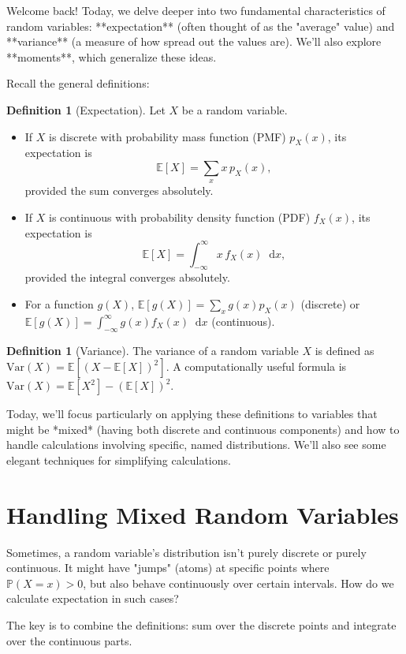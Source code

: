 \documentclass[11pt, letterpaper]{article}
\theoremstyle{plain} %
\theoremstyle{definition} %
\newtheorem{definition}[theorem]{Definition}
\theoremstyle{remark} %
\newcommand{\E}{\mathbb{E}}
\newcommand{\Var}{\mathrm{Var}}
\newcommand{\Prob}{\mathbb{P}}
\newcommand{\dee}{\mathop{}\!\mathrm{d}} %
\begin{document}
Welcome back! Today, we delve deeper into two fundamental characteristics of random variables: **expectation** (often thought of as the "average" value) and **variance** (a measure of how spread out the values are). We'll also explore **moments**, which generalize these ideas.

Recall the general definitions:

\begin{definition}[Expectation]
Let $X$ be a random variable.
\begin{itemize}
    \item If $X$ is discrete with probability mass function (PMF) $p_X(x)$, its expectation is
          \[ \E[X] = \sum_x x \, p_X(x), \]
          provided the sum converges absolutely.
    \item If $X$ is continuous with probability density function (PDF) $f_X(x)$, its expectation is
          \[ \E[X] = \int_{-\infty}^{\infty} x \, f_X(x) \dee x, \]
          provided the integral converges absolutely.
    \item For a function $g(X)$, $\E[g(X)] = \sum_x g(x) p_X(x)$ (discrete) or $\E[g(X)] = \int_{-\infty}^{\infty} g(x) f_X(x) \dee x$ (continuous).
\end{itemize}
\end{definition}

\begin{definition}[Variance]
The variance of a random variable $X$ is defined as $\Var(X) = \E[(X - \E[X])^2]$. A computationally useful formula is $\Var(X) = \E[X^2] - (\E[X])^2$.
\end{definition}

Today, we'll focus particularly on applying these definitions to variables that might be *mixed* (having both discrete and continuous components) and how to handle calculations involving specific, named distributions. We'll also see some elegant techniques for simplifying calculations.

\section{Handling Mixed Random Variables}

Sometimes, a random variable's distribution isn't purely discrete or purely continuous. It might have "jumps" (atoms) at specific points where $\Prob(X=x) > 0$, but also behave continuously over certain intervals. How do we calculate expectation in such cases?

The key is to combine the definitions: sum over the discrete points and integrate over the continuous parts.
\end{document}
